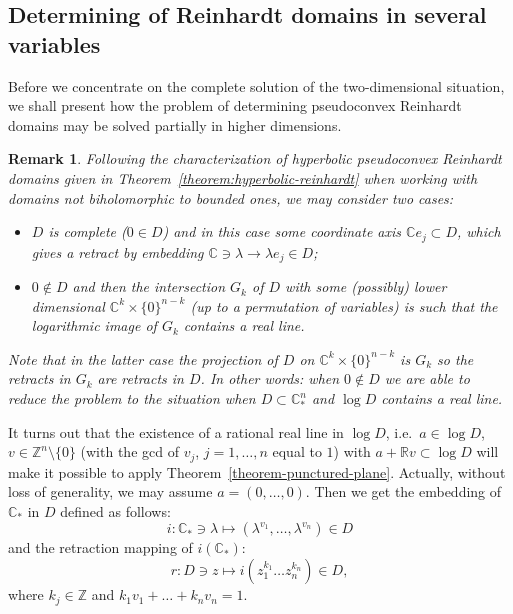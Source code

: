 \documentclass[a4paper,12pt]{amsart}
\newtheorem{remark}[theorem]{Remark}
\theoremstyle{definition}
\begin{document}
\subsection{Determining of Reinhardt domains in several variables}
Before we concentrate on the complete solution of the two-dimensional situation, we shall present how the problem of determining pseudoconvex Reinhardt domains may be solved partially in higher dimensions.


\begin{remark}\label{remark-reinhardt} Following the characterization of hyperbolic pseudoconvex Reinhardt domains given in Theorem~\ref{theorem:hyperbolic-reinhardt}
when working with domains not biholomorphic to bounded ones, we may consider two cases:

\begin{itemize}
    \item $D$ is complete ($0\in D$) and in this case some coordinate axis $\mathbb C e_j\subset D$, which gives a retract by embedding $\mathbb C\owns\lambda\to \lambda e_j\in D$;
\item $0\not\in D$ and then the intersection $G_k$ of $D$ with some (possibly) lower dimensional $\mathbb C^k\times\{0\}^{n-k}$ (up to a permutation of variables)  is such  that the logarithmic image of $G_k$ contains a real line. 
\end{itemize}

Note that in the latter case the projection of $D$ on $\mathbb C^k\times\{0\}^{n-k}$ is $G_k$ so the retracts in $G_k$ are retracts in $D$. In other words: when $0\not\in D$ we are able to reduce the problem to the situation when $D\subset \mathbb C^n_*$ and $\log D$ contains a real line.
\end{remark}

It turns out that the existence of a rational real line in $\log D$, i.e.\ $a\in\log D$, $v\in \mathbb Z^n\setminus\{0\}$ (with the gcd of $v_j$, $j=1,\ldots,n$ equal to $1$) with $a+\mathbb Rv\subset\log D$ will make it possible to apply Theorem~\ref{theorem-punctured-plane}. Actually, without loss of generality, we may assume $a=(0,\ldots,0)$. Then we get the embedding of $\mathbb C_*$ in $D$ defined as follows:
\begin{equation}
i \colon \mathbb C_*\owns\lambda \mapsto (\lambda^{v_1},\ldots,\lambda^{v_n})\in D
\end{equation}
and the retraction mapping of $i(\mathbb C_*)$:
\begin{equation}
    r \colon D\owns z \mapsto i(z_1^{k_1}\ldots z_n^{k_n}) \in D,
\end{equation}
    where $k_j\in\mathbb Z$ and $k_1v_1+\ldots+k_nv_n=1$.
\end{document}
